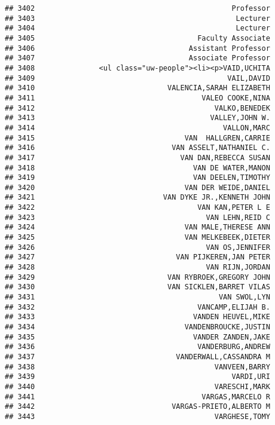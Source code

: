 \documentclass[
]{article}
\begin{document}
\begin{verbatim}
## 3402                                              Professor
## 3403                                               Lecturer
## 3404                                               Lecturer
## 3405                                      Faculty Associate
## 3406                                    Assistant Professor
## 3407                                    Associate Professor
## 3408               <ul class="uw-people"><li><p>VAID,UCHITA
## 3409                                             VAIL,DAVID
## 3410                               VALENCIA,SARAH ELIZABETH
## 3411                                       VALEO COOKE,NINA
## 3412                                          VALKO,BENEDEK
## 3413                                         VALLEY,JOHN W.
## 3414                                            VALLON,MARC
## 3415                                   VAN  HALLGREN,CARRIE
## 3416                                VAN ASSELT,NATHANIEL C.
## 3417                                  VAN DAN,REBECCA SUSAN
## 3418                                     VAN DE WATER,MANON
## 3419                                     VAN DEELEN,TIMOTHY
## 3420                                   VAN DER WEIDE,DANIEL
## 3421                              VAN DYKE JR.,KENNETH JOHN
## 3422                                      VAN KAN,PETER L E
## 3423                                        VAN LEHN,REID C
## 3424                                   VAN MALE,THERESE ANN
## 3425                                   VAN MELKEBEEK,DIETER
## 3426                                        VAN OS,JENNIFER
## 3427                                 VAN PIJKEREN,JAN PETER
## 3428                                        VAN RIJN,JORDAN
## 3429                               VAN RYBROEK,GREGORY JOHN
## 3430                               VAN SICKLEN,BARRET VILAS
## 3431                                           VAN SWOL,LYN
## 3432                                      VANCAMP,ELIJAH B.
## 3433                                     VANDEN HEUVEL,MIKE
## 3434                                   VANDENBROUCKE,JUSTIN
## 3435                                     VANDER ZANDEN,JAKE
## 3436                                      VANDERBURG,ANDREW
## 3437                                 VANDERWALL,CASSANDRA M
## 3438                                          VANVEEN,BARRY
## 3439                                              VARDI,URI
## 3440                                          VARESCHI,MARK
## 3441                                       VARGAS,MARCELO R
## 3442                                VARGAS-PRIETO,ALBERTO M
## 3443                                          VARGHESE,TOMY

\end{verbatim}
\end{document}
